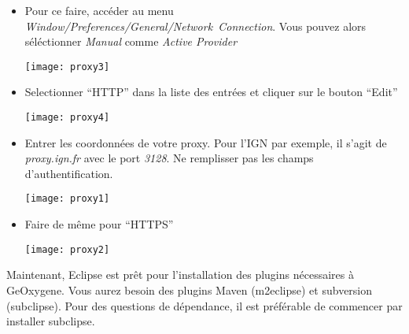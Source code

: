 \begin{itemize}[leftmargin=* ,parsep=0cm,itemsep=0cm,topsep=0cm]

\item Pour ce faire, accéder au menu \emph{Window/Preferences/General/Network~Connection}. Vous pouvez alors séléctionner \emph{Manual} comme \emph{Active Provider} 

\begin{center}
\texttt{[image: proxy3]}
\end{center}

\item Selectionner “HTTP” dans la liste des entrées et cliquer sur le bouton “Edit”

\begin{center}
\texttt{[image: proxy4]}
\end{center}


\item Entrer les coordonnées de votre proxy. Pour l'IGN par exemple, il s'agit de \emph{proxy.ign.fr} avec le port \emph{3128}. Ne remplisser pas les champs d'authentification.

\begin{center}
\texttt{[image: proxy1]}
\end{center}


\item Faire de même pour “HTTPS”

\begin{center}
\texttt{[image: proxy2]}
\end{center}


\end{itemize}

\noindent
Maintenant, Eclipse est prêt pour l'installation des plugins nécessaires à GeOxygene. Vous aurez besoin des plugins Maven (m2eclipse) et subversion (subclipse). Pour des questions de d\'ependance, il est pr\'ef\'erable de commencer par installer subclipse.

